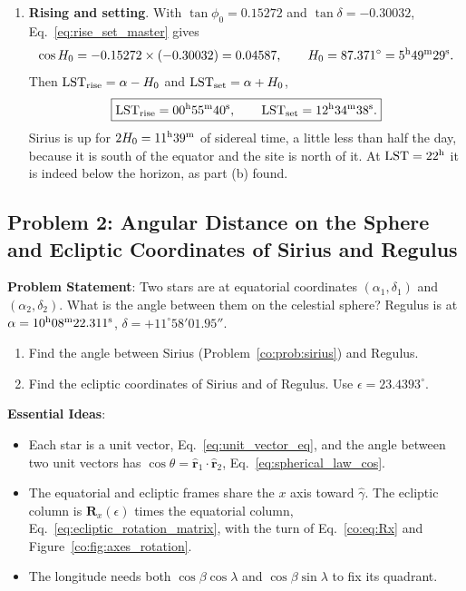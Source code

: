 \begin{enumerate}[label=(\alph*)]
	\item \textbf{Rising and setting}. With $\tan\phi_0=0.15272$ and $\tan\delta=-0.30032$, Eq.~\eqref{eq:rise_set_master} gives
	\[
	\cos H_0=-0.15272\times(-0.30032)=0.04587,\qquad H_0=87.371^\circ=5^{\rm h}49^{\rm m}29^{\rm s}.
	\]
	Then $\mathrm{LST}_{\rm rise}=\alpha-H_0$ and $\mathrm{LST}_{\rm set}=\alpha+H_0$,
	\[
	\boxed{\mathrm{LST}_{\rm rise}=00^{\rm h}55^{\rm m}40^{\rm s},\qquad \mathrm{LST}_{\rm set}=12^{\rm h}34^{\rm m}38^{\rm s}.}
	\]
	Sirius is up for $2H_0=11^{\rm h}39^{\rm m}$ of sidereal time, a little less than half the day, because it is south of the equator and the site is north of it. At $\mathrm{LST}=22^{\rm h}$ it is indeed below the horizon, as part (b) found.
\end{enumerate}

\subsection{Problem 2: Angular Distance on the Sphere and Ecliptic Coordinates of Sirius and Regulus}
\label{co:prob:regulus}

\textbf{Problem Statement}: Two stars are at equatorial coordinates $(\alpha_1,\delta_1)$ and $(\alpha_2,\delta_2)$. What is the angle between them on the celestial sphere? Regulus is at $\alpha=10^{\rm h}08^{\rm m}22.311^{\rm s}$, $\delta=+11^\circ58'01.95''$.
\begin{enumerate}[label=(\alph*)]
	\item Find the angle between Sirius (Problem~\ref{co:prob:sirius}) and Regulus.
	\item Find the ecliptic coordinates of Sirius and of Regulus. Use $\epsilon=23.4393^\circ$.
\end{enumerate}

\textbf{Essential Ideas}:
\begin{itemize}
	\item Each star is a unit vector, Eq.~\eqref{eq:unit_vector_eq}, and the angle between two unit vectors has $\cos\theta=\hat{\mathbf r}_1\cdot\hat{\mathbf r}_2$, Eq.~\eqref{eq:spherical_law_cos}.
	\item The equatorial and ecliptic frames share the $x$ axis toward $\hat\gamma$. The ecliptic column is $\mathbf R_x(\epsilon)$ times the equatorial column, Eq.~\eqref{eq:ecliptic_rotation_matrix}, with the turn of Eq.~\eqref{co:eq:Rx} and Figure~\ref{co:fig:axes_rotation}.
	\item The longitude needs both $\cos\beta\cos\lambda$ and $\cos\beta\sin\lambda$ to fix its quadrant.
\end{itemize}

